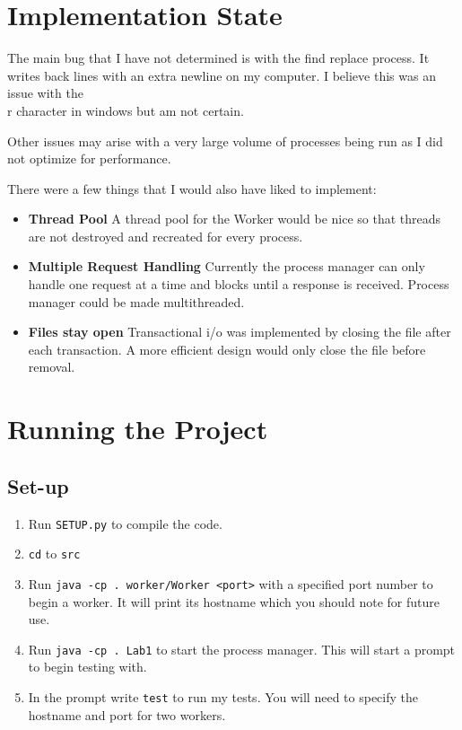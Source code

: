 \documentclass[12pt]{article}
\begin{document}

\section{Implementation State}
The main bug that I have not determined is with the find replace process. It writes back lines with an extra newline on my computer. I believe this was an issue with the \\r character in windows but am not certain.

Other issues may arise with a very large volume of processes being run as I did not optimize for performance.

There were a few things that I would also have liked to implement:
\begin{itemize}
\item \textbf{Thread Pool} A thread pool for the Worker would be nice so that threads are not destroyed and recreated for every process.
\item \textbf{Multiple Request Handling} Currently the process manager can only handle one request at a time and blocks until a response is received. Process manager could be made multithreaded.
\item \textbf{Files stay open} Transactional i/o was implemented by closing the file after each transaction. A more efficient design would only close the file before removal.
\end{itemize}


\section{Running the Project}

\subsection{Set-up}
\begin{enumerate}
\item Run \texttt{SETUP.py} to compile the code.
\item \texttt{cd} to \texttt{src}
\item Run \texttt{java -cp . worker/Worker <port>} with a specified port number to begin a worker. It will print its hostname which you should note for future use.
\item Run \texttt{java -cp . Lab1} to start the process manager. This will start a prompt to begin testing with.
\item In the prompt write \texttt{test} to run my tests. You will need to specify the hostname and port for two workers.
\end{enumerate}
\end{document}
